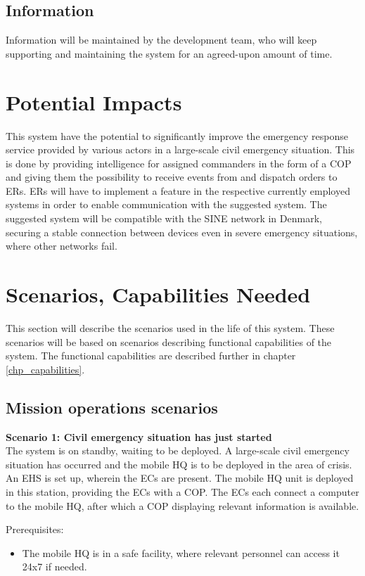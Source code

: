 \subsection{Information}
Information will be maintained by the development team, who will keep supporting and maintaining the system for an agreed-upon amount of time.


\section{Potential Impacts}
This system have the potential to significantly improve the emergency response service provided by various actors in a large-scale civil emergency situation. This is done by providing intelligence for assigned commanders in the form of a COP and giving them the possibility to receive events from and dispatch orders to ERs. ERs will have to implement a feature in the respective currently employed systems in order to enable communication with the suggested system. 
The suggested system will be compatible with the SINE network in Denmark, securing a stable connection between devices even in severe emergency situations, where other networks fail.


\newpage
\section{Scenarios, Capabilities Needed}
\label{sec_scenarios}
This section will describe the scenarios used	in the life of this system. These scenarios will be based on scenarios describing functional capabilities of the system. The functional capabilities are described further in chapter \ref{chp_capabilities}.

\subsection{Mission operations scenarios}
\noindent \textbf{Scenario 1: Civil emergency situation has just started} \\
The system is on standby, waiting to be deployed. 
A large-scale civil emergency situation has occurred and the mobile HQ is to be deployed in the area of crisis. An EHS is set up, wherein the ECs are present. The mobile HQ unit is deployed in this station, providing the ECs with a COP. The ECs each connect a computer to the mobile HQ, after which a COP displaying relevant information is available.

\noindent Prerequisites:
\begin{itemize}
	\item The mobile HQ is in a safe facility, where relevant personnel can access it 24x7 if needed.
\end{itemize}

